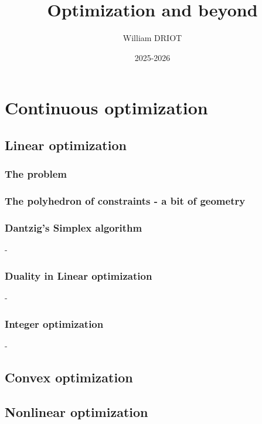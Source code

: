 \documentclass[12pt,openany,oneside]{book}
\title{\textbf{Optimization and beyond}}
\author{William DRIOT}
\date{2025-2026}
\theoremstyle{definition}
\numberwithin{definition}{section}
\numberwithin{theorem}{section}
\numberwithin{corollary}{section}
\numberwithin{proposition}{section}
\numberwithin{notation}{section}
\numberwithin{remark}{section}
\numberwithin{hypothesis}{section}
\numberwithin{example}{section}
\begin{document}
\maketitle

\tableofcontents

\setlength{\parindent}{15pt}
\setlength{\parskip}{6pt}

\newpage



\part{Continuous optimization}

\chapter{Linear optimization}

\section{The problem}

\section{The polyhedron of constraints - a bit of geometry}

\section{Dantzig's Simplex algorithm}-
\section{Duality in Linear optimization}-
\section{Integer optimization}-

\chapter{Convex optimization}

\chapter{Nonlinear optimization}
\end{document}
